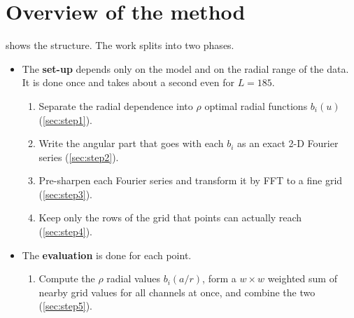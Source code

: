 \documentclass[11pt,a4paper]{article}
\theoremstyle{definition}
\begin{document}
\section{Overview of the method}\label{sec:overview}

 shows the structure. The work splits into two phases.
\begin{itemize}
\item The \textbf{set-up} depends only on the model and on the radial range of the data. It is done once and takes about a second
  even for $L=185$.
  \begin{enumerate}[label=Step \arabic*:,leftmargin=4.2em]
  \item Separate the radial dependence into $\rho$ optimal radial functions $b_i(u)$ (\cref{sec:step1}).
  \item Write the angular part that goes with each $b_i$ as an exact 2-D Fourier series (\cref{sec:step2}).
  \item Pre-sharpen each Fourier series and transform it by FFT to a fine grid (\cref{sec:step3}).
  \item Keep only the rows of the grid that points can actually reach (\cref{sec:step4}).
  \end{enumerate}
\item The \textbf{evaluation} is done for each point.
  \begin{enumerate}[label=Step \arabic*:,leftmargin=4.2em,start=5]
  \item Compute the $\rho$ radial values $b_i(a/r)$, form a $w\times w$ weighted sum of nearby grid values for all
    channels at once, and combine the two (\cref{sec:step5}).
  \end{enumerate}
\end{itemize}
\end{document}
